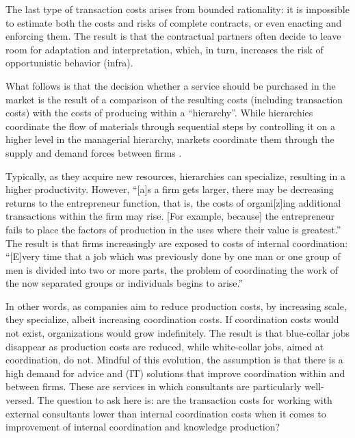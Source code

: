 \documentclass[12pt]{article}
\begin{document}
The last type of transaction costs arises from bounded rationality: it
is impossible to estimate both the costs and risks of complete
contracts, or even enacting and enforcing them. \citep[ 53]{aubert1996}
The result is that the contractual partners often decide to leave room
for adaptation and interpretation, which, in turn, increases the risk of
opportunistic behavior (infra).

What follows is that the decision whether a service should be purchased
in the market is the result of a comparison of the resulting costs
(including transaction costs) with the costs of producing within a
``hierarchy''. While hierarchies coordinate the flow of materials
through sequential steps by controlling it on a higher level in the
managerial hierarchy, markets coordinate them through the supply and
demand forces between firms \citep[ 485]{malone1987}.

Typically, as they acquire new resources, hierarchies can specialize,
resulting in a higher productivity. However, ``{[}a{]}s a firm gets
larger, there may be decreasing returns to the entrepreneur function,
that is, the costs of organi{[}z{]}ing additional transactions within
the firm may rise. {[}For example, because{]} the entrepreneur fails to
place the factors of production in the uses where their value is
greatest.'' \citep[ 394-395]{coase1937} The result is that firms
increasingly are exposed to costs of internal coordination:
``{[}E{]}very time that a job which was previously done by one man or
one group of men is divided into two or more parts, the problem of
coordinating the work of the now separated groups or individuals begins
to arise.'' \citep[ 40]{robinson1931}

In other words, as companies aim to reduce production costs, by
increasing scale, they specialize, albeit increasing coordination costs.
If coordination costs would not exist, organizations would grow
indefinitely. The result is that blue-collar jobs disappear as
production costs are reduced, while white-collar jobs, aimed at
coordination, do not. \citep[ 31-32]{canback1998} Mindful of this
evolution, the assumption is that there is a high demand for advice and
(IT) solutions that improve coordination within and between firms. These
are services in which consultants are particularly well-versed. The
question to ask here is: are the transaction costs for working with
external consultants lower than internal coordination costs when it
comes to improvement of internal coordination and knowledge production?
\end{document}
